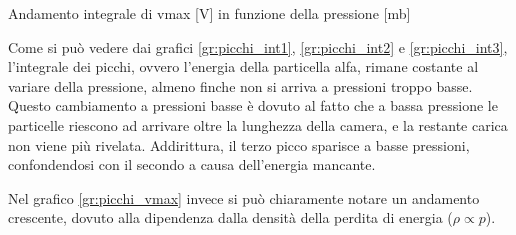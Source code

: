 \begin{grafico}
 \centering
 \caption{Andamento integrale di vmax [V] in funzione della pressione [mb]} 
 \label{gr:picchi_vmax} 
\end{grafico}

Come si può vedere dai grafici 	\autoref{gr:picchi_int1}, \autoref{gr:picchi_int2} e \autoref{gr:picchi_int3}, l'integrale dei picchi, ovvero l'energia della particella alfa, rimane costante al variare della pressione,
almeno finche non si arriva a pressioni troppo basse. Questo cambiamento a pressioni basse è dovuto al fatto che a bassa pressione le particelle riescono ad arrivare oltre la lunghezza della camera, e la restante carica non viene più rivelata.
Addirittura, il terzo picco sparisce a basse pressioni, confondendosi con il secondo a causa dell'energia mancante.

Nel grafico \autoref{gr:picchi_vmax} invece si può chiaramente notare un andamento crescente, dovuto alla dipendenza dalla densità della perdita di energia ($\rho\propto p$).

\FloatBarrier